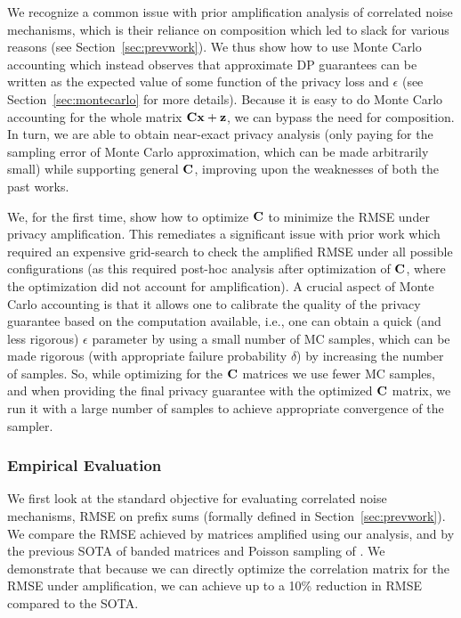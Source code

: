  We recognize a common issue with prior amplification analysis of correlated noise mechanisms, which is their reliance on composition which led to slack for various reasons (see Section~\ref{sec:prevwork}). We thus show how to use Monte Carlo accounting \citep{wang2023randomized} which instead observes that approximate DP guarantees can be written as the expected value of some function of the privacy loss and $\epsilon$ (see Section~\ref{sec:montecarlo} for more details). Because it is easy to do Monte Carlo accounting for the whole matrix $\mathbf{C} \mathbf{x} + \mathbf{z}$, we can bypass the need for composition. In turn, we are able to obtain near-exact privacy analysis (only paying for the sampling error of Monte Carlo approximation, which can be made arbitrarily small) while supporting general $\mathbf{C}$, improving upon the weaknesses of both the past works.

 We, for the first time, show how to optimize $\mathbf{C}$ to minimize the RMSE under privacy amplification. This remediates a significant issue with prior work which required an expensive grid-search to check the amplified RMSE under all possible configurations (as this required post-hoc analysis after optimization of $\mathbf{C}$, where the optimization did not account for amplification). A crucial aspect of Monte Carlo accounting is that it allows one to calibrate the quality of the privacy guarantee based on the computation available, i.e., one can obtain a quick (and less rigorous) $\epsilon$ parameter by using a small number of MC samples, which can be made rigorous (with appropriate failure probability $\delta$) by increasing the number of samples. So, while optimizing for the $\mathbf{C}$ matrices we use fewer MC samples, and when providing the final privacy guarantee with the optimized $\mathbf{C}$ matrix, we run it with a large number of samples to achieve appropriate convergence of the sampler.

\subsubsection{Empirical Evaluation}
\label{sec:emp}

 We first look at the standard objective for evaluating correlated noise mechanisms,  RMSE on prefix sums (formally defined in Section~\ref{sec:prevwork}). We compare the RMSE achieved by matrices amplified using our analysis, and by the previous SOTA of banded matrices and Poisson sampling of \citet{choquette2024amplified}. We demonstrate that because we can directly optimize the correlation matrix for the RMSE under amplification, we can achieve up to a 10\% reduction in RMSE compared to the SOTA. 

